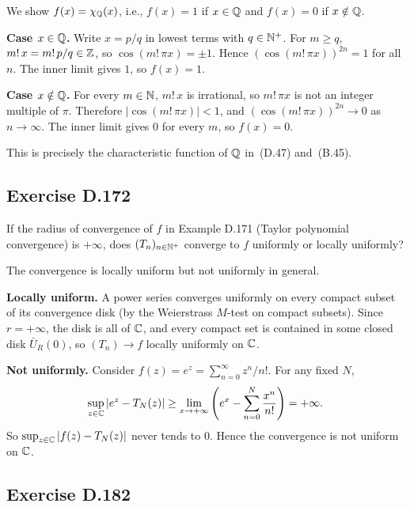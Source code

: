 \documentclass{article}
\begin{document}
\begin{solution}
  We show $f(x) = \chi_{\mathbb{Q}}(x)$, i.e., $f(x) = 1$ if $x \in \mathbb{Q}$
  and $f(x) = 0$ if $x \notin \mathbb{Q}$.

  \textbf{Case $x \in \mathbb{Q}$.}\;
  Write $x = p/q$ in lowest terms with $q \in \mathbb{N}^+$.
  For $m \ge q$, $m!\,x = m!\,p/q \in \mathbb{Z}$, so
  $\cos(m!\,\pi x) = \pm 1$.
  Hence $(\cos(m!\,\pi x))^{2n} = 1$ for all $n$.
  The inner limit gives $1$, so $f(x) = 1$.

  \textbf{Case $x \notin \mathbb{Q}$.}\;
  For every $m \in \mathbb{N}$, $m!\,x$ is irrational,
  so $m!\,\pi x$ is not an integer multiple of $\pi$.
  Therefore $|\cos(m!\,\pi x)| < 1$, and
  $(\cos(m!\,\pi x))^{2n} \to 0$ as $n \to \infty$.
  The inner limit gives $0$ for every $m$, so $f(x) = 0$.

  This is precisely the characteristic function of $\mathbb{Q}$
  in~(D.47) and~(B.45).
\end{solution}

\subsection{Exercise D.172}

If the radius of convergence of $f$ in Example D.171
(Taylor polynomial convergence) is $+\infty$,
does $(T_n)_{n \in \mathbb{N}^+}$ converge to $f$ uniformly
or locally uniformly?

\begin{solution}
  The convergence is locally uniform but not uniformly in general.

  \textbf{Locally uniform.}\;
  A power series converges uniformly on every compact subset
  of its convergence disk (by the Weierstrass $M$-test on compact
  subsets).  Since $r = +\infty$, the disk is all of $\mathbb{C}$,
  and every compact set is contained in some closed disk
  $\bar{U}_R(0)$, so $(T_n) \to f$ locally uniformly on $\mathbb{C}$.

  \textbf{Not uniformly.}\;
  Consider $f(z) = e^z = \sum_{n=0}^{\infty} z^n/n!$.
  For any fixed $N$,
  \[
    \sup_{z \in \mathbb{C}}\left|e^z - T_N(z)\right|
    \ge \lim_{x \to +\infty}\left(e^x - \sum_{n=0}^{N}\frac{x^n}{n!}\right)
    = +\infty.
  \]
  So $\sup_{z \in \mathbb{C}}|f(z) - T_N(z)|$ never tends to $0$.
  Hence the convergence is not uniform on $\mathbb{C}$.\qedhere
\end{solution}

\subsection{Exercise D.182}
\end{document}
